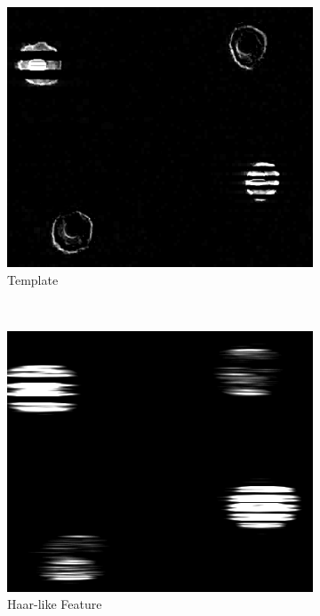 \begin{figure}[!t]
\begin{subfigure}[h]{0.16\textwidth}
      \includegraphics[width=\textwidth]{pic/bbox/bbox_E_template_crop.png}
      \caption{Template} \label{fig:bbox_template}
   \end{subfigure}%
   ~
   \begin{subfigure}[h]{0.16\textwidth}
      \includegraphics[width=\textwidth]{pic/bbox/bbox_F_haar_crop.png}
      \caption{Haar-like Feature} \label{fig:bbox_haar}
   \end{subfigure}%
   ~   
   \begin{subfigure}[h]{0.16\textwidth}

\end{subfigure}
\end{figure}
